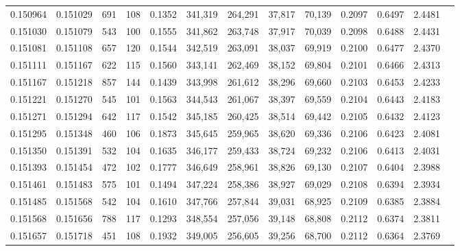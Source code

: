 \begin{tabular}{rrrrrrrrrrrrr}
0.150964 & 0.151029 &   691 & 108 &                                     0.1352 & 341,319 & 264,291 &  37,817 &  70,139 & 0.2097 & 0.6497 & 2.4481 \\
0.151030 & 0.151079 &   543 & 100 &                                     0.1555 & 341,862 & 263,748 &  37,917 &  70,039 & 0.2098 & 0.6488 & 2.4431 \\
0.151081 & 0.151108 &   657 & 120 &                                     0.1544 & 342,519 & 263,091 &  38,037 &  69,919 & 0.2100 & 0.6477 & 2.4370 \\
0.151111 & 0.151167 &   622 & 115 &                                     0.1560 & 343,141 & 262,469 &  38,152 &  69,804 & 0.2101 & 0.6466 & 2.4313 \\
0.151167 & 0.151218 &   857 & 144 &                                     0.1439 & 343,998 & 261,612 &  38,296 &  69,660 & 0.2103 & 0.6453 & 2.4233 \\
0.151221 & 0.151270 &   545 & 101 &                                     0.1563 & 344,543 & 261,067 &  38,397 &  69,559 & 0.2104 & 0.6443 & 2.4183 \\
0.151271 & 0.151294 &   642 & 117 &                                     0.1542 & 345,185 & 260,425 &  38,514 &  69,442 & 0.2105 & 0.6432 & 2.4123 \\
0.151295 & 0.151348 &   460 & 106 &                                     0.1873 & 345,645 & 259,965 &  38,620 &  69,336 & 0.2106 & 0.6423 & 2.4081 \\
0.151350 & 0.151391 &   532 & 104 &                                     0.1635 & 346,177 & 259,433 &  38,724 &  69,232 & 0.2106 & 0.6413 & 2.4031 \\
0.151393 & 0.151454 &   472 & 102 &                                     0.1777 & 346,649 & 258,961 &  38,826 &  69,130 & 0.2107 & 0.6404 & 2.3988 \\
0.151461 & 0.151483 &   575 & 101 &                                     0.1494 & 347,224 & 258,386 &  38,927 &  69,029 & 0.2108 & 0.6394 & 2.3934 \\
0.151485 & 0.151568 &   542 & 104 &                                     0.1610 & 347,766 & 257,844 &  39,031 &  68,925 & 0.2109 & 0.6385 & 2.3884 \\
0.151568 & 0.151656 &   788 & 117 &                                     0.1293 & 348,554 & 257,056 &  39,148 &  68,808 & 0.2112 & 0.6374 & 2.3811 \\
0.151657 & 0.151718 &   451 & 108 &                                     0.1932 & 349,005 & 256,605 &  39,256 &  68,700 & 0.2112 & 0.6364 & 2.3769 \\

\end{tabular}
